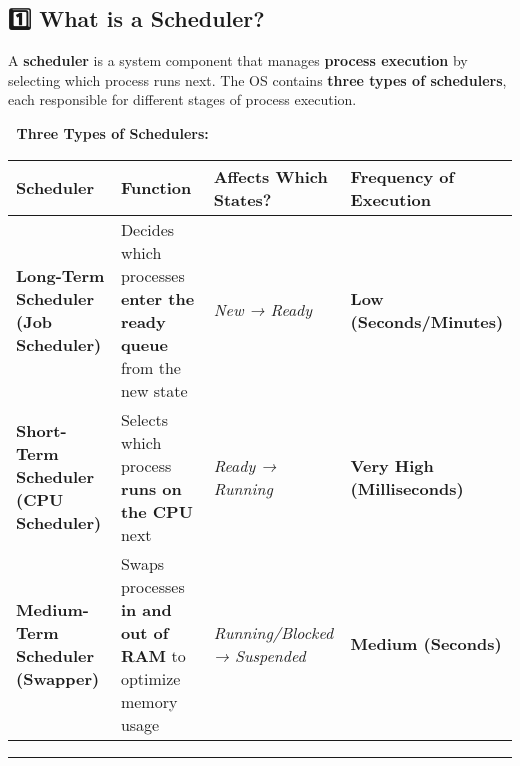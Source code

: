 \documentclass[
]{article}
\begin{document}
\subsection{\texorpdfstring{\textbf{1️⃣ What is a
Scheduler?}}{1️⃣ What is a Scheduler?}}\label{what-is-a-scheduler}

A \textbf{scheduler} is a system component that manages \textbf{process
execution} by selecting which process runs next. The OS contains
\textbf{three types of schedulers}, each responsible for different
stages of process execution.

📌 \textbf{Three Types of Schedulers:}

\begin{longtable}[]{@{}
  >{\raggedright\arraybackslash}p{}
  >{\raggedright\arraybackslash}p{}
  >{\raggedright\arraybackslash}p{}
  >{\raggedright\arraybackslash}p{}@{}}
\toprule\noalign{}
\begin{minipage}[b]{\linewidth}\raggedright
\textbf{Scheduler}
\end{minipage} & \begin{minipage}[b]{\linewidth}\raggedright
\textbf{Function}
\end{minipage} & \begin{minipage}[b]{\linewidth}\raggedright
\textbf{Affects Which States?}
\end{minipage} & \begin{minipage}[b]{\linewidth}\raggedright
\textbf{Frequency of Execution}
\end{minipage} \\
\midrule\noalign{}
\endhead
\bottomrule\noalign{}
\endlastfoot
\textbf{Long-Term Scheduler (Job Scheduler)} & Decides which processes
\textbf{enter the ready queue} from the new state & \emph{New → Ready} &
\textbf{Low (Seconds/Minutes)} \\
\textbf{Short-Term Scheduler (CPU Scheduler)} & Selects which process
\textbf{runs on the CPU} next & \emph{Ready → Running} & \textbf{Very
High (Milliseconds)} \\
\textbf{Medium-Term Scheduler (Swapper)} & Swaps processes \textbf{in
and out of RAM} to optimize memory usage & \emph{Running/Blocked →
Suspended} & \textbf{Medium (Seconds)} \\
\end{longtable}

\begin{center}\rule{0.5\linewidth}{0.5pt}\end{center}
\end{document}
